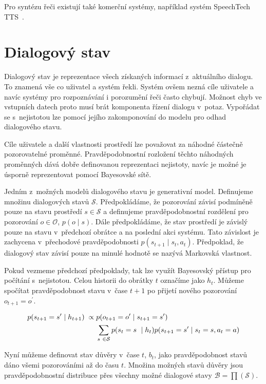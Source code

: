 Pro syntézu řeči existují také komerční systémy, například systém SpeechTech TTS~\cite{speechtech}.

\section{Dialogový stav}

Dialogový stav je reprezentace všech získaných informací z~aktuálního dialogu.
To znamená vše co uživatel a systém řekli.
Systém ovšem nezná cíle uživatele a navíc systémy pro rozpoznávání i porozumění řeči často chybují.
Možnost chyb ve vstupních datech proto musí brát komponenta řízení dialogu v~potaz.
Vypořádat se s~nejistotou lze pomocí jejího zakomponování do modelu pro odhad dialogového stavu.

Cíle uživatele a další vlastnosti prostředí lze považovat za náhodné částečně pozorovatelné proměnné.
Pravděpodobnostní rozložení těchto náhodných proměnných dává dobře definovanou reprezentaci nejistoty, navíc je možné je úsporně reprezentovat pomocí Bayesovské sítě.

Jedním z~možných modelů dialogového stavu je generativní model.
Definujeme množinu dialogových stavů $\mathcal{S}$.
Předpokládáme, že pozorování závisí podmíněně pouze na stavu prostředí $s \in \mathcal{S}$ a definujeme pravděpodobnostní rozdělení pro pozorování $o \in \mathcal{O}$, $p(o \mid s)$.
Dále předpokládáme, že stav prostředí je závislý pouze na stavu v~předchozí obrátce a na poslední akci systému.
Tato závislost je zachycena v~přechodové pravděpodobnosti $p(s_{t+1} \mid s_t, a_t)$.
Předpoklad, že dialogový stav závisí pouze na minulé hodnotě se nazývá Markovská vlastnost.

Pokud vezmeme předchozí předpoklady, tak lze využít Bayesovský přístup pro počítání s~nejistotou.
Celou historii do obrátky $t$ označíme jako $h_t$.
Můžeme spočítat pravděpodobnost stavu v~čase $t+1$ po přijetí nového pozorování $o_{t+1} = o^\prime$.

\begin{align}
\small
p(s_{t+1} = s^\prime \mid h_{t+1}) \; \propto \;& 
    p(o_{t+1} = o^\prime \mid s_{t+1} = s^\prime)
\label{eq:beliefupdate} \\
    &\sum_{s~\in \mathcal{S}}
        p(s_t = s~\mid h_t)
        p(s_{t+1} = s^\prime \mid s_t = s, a_t = a) \nonumber
\end{align}

Nyní můžeme definovat stav důvěry v~čase $t$, $b_t$, jako pravděpodobnost stavů dáno všemi pozorováními až do času $t$.
Množina možných stavů důvěry jsou pravděpodobnostní distribuce přes všechny možné dialogové stavy $\mathcal{B} = \prod(\mathcal{S})$.

